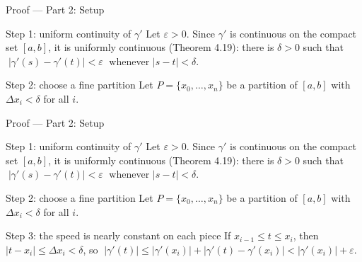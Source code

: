 \documentclass[aspectratio=169,12pt,t]{beamer}
\begin{document}
{%
\begin{frame}{Proof --- Part 2: Setup}
  \begin{proofblock}{Step 1: uniform continuity of $\gamma'$}
    Let $\varepsilon > 0$. Since $\gamma'$ is continuous on the compact
    set $[a, b]$, it is \alert{uniformly continuous} (Theorem 4.19):
    there is $\delta > 0$ such that
    $\; |\gamma'(s) - \gamma'(t)| < \varepsilon \;$ whenever $|s - t| < \delta$.
  \end{proofblock}

  \begin{proofblock}{Step 2: choose a fine partition}
    Let $P = \{x_0, \dots, x_n\}$ be a partition of $[a, b]$ with
    $\Delta x_i < \delta$ for all $i$.
  \end{proofblock}

\end{frame}

\begin{frame}{Proof --- Part 2: Setup}
  \begin{proofblock}{Step 1: uniform continuity of $\gamma'$}
    Let $\varepsilon > 0$. Since $\gamma'$ is continuous on the compact
    set $[a, b]$, it is \alert{uniformly continuous} (Theorem 4.19):
    there is $\delta > 0$ such that
    $\; |\gamma'(s) - \gamma'(t)| < \varepsilon \;$ whenever $|s - t| < \delta$.
  \end{proofblock}

  \begin{proofblock}{Step 2: choose a fine partition}
    Let $P = \{x_0, \dots, x_n\}$ be a partition of $[a, b]$ with
    $\Delta x_i < \delta$ for all $i$.
  \end{proofblock}

  \begin{proofblock}{Step 3: the speed is nearly constant on each piece}
    If $x_{i-1} \leq t \leq x_i$, then $|t - x_i| \leq \Delta x_i < \delta$, so
    $\; |\gamma'(t)| \leq |\gamma'(x_i)| + |\gamma'(t) - \gamma'(x_i)|
      < |\gamma'(x_i)| + \varepsilon.$
  \end{proofblock}


\end{frame}}
\end{document}
